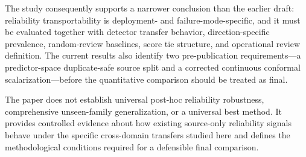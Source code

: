 \documentclass[conference]{IEEEtran}
\begin{document}
The study consequently supports a narrower conclusion than the earlier draft: reliability transportability is deployment- and failure-mode-specific, and it must be evaluated together with detector transfer behavior, direction-specific prevalence, random-review baselines, score tie structure, and operational review definition. The current results also identify two pre-publication requirements---a predictor-space duplicate-safe source split and a corrected continuous conformal scalarization---before the quantitative comparison should be treated as final.

The paper does not establish universal post-hoc reliability robustness, comprehensive unseen-family generalization, or a universal best method. It provides controlled evidence about how existing source-only reliability signals behave under the specific cross-domain transfers studied here and defines the methodological conditions required for a defensible final comparison.
\end{document}
